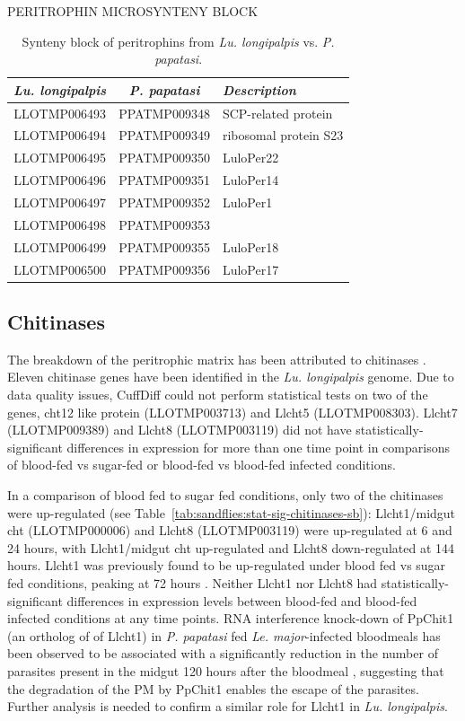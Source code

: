 \begin{table}[H]
  \centering
  \caption{PERITROPHIN MICROSYNTENY BLOCK}
  \begin{tabular}{c c l} \hline
    \emph{Lu. longipalpis} & \emph{P. papatasi} & \emph{Description} \\ \hline
    LLOTMP006493 & PPATMP009348 & SCP-related protein \\
    LLOTMP006494 & PPATMP009349 & ribosomal protein S23 \\
    LLOTMP006495 & PPATMP009350 & LuloPer22 \\
    LLOTMP006496 & PPATMP009351 & LuloPer14 \\
    LLOTMP006497 & PPATMP009352 & LuloPer1 \\
    LLOTMP006498 & PPATMP009353 &  \\
    LLOTMP006499 & PPATMP009355 & LuloPer18 \\
    LLOTMP006500 & PPATMP009356 & LuloPer17
  \end{tabular}
  \caption*{Synteny block of peritrophins from \emph{Lu. longipalpis} vs. \emph{P. papatasi}.}
  \label{tab:synteny-llot-ppat-peritrophic}
\end{table}


\subsection{Chitinases}
The breakdown of the peritrophic matrix has been attributed to chitinases \cite{Dostalova2012}. Eleven chitinase genes have been identified in the \emph{Lu. longipalpis} genome. Due to data quality issues, CuffDiff could not perform statistical tests on two of the genes, cht12 like protein (LLOTMP003713) and Llcht5 (LLOTMP008303). Llcht7 (LLOTMP009389) and Llcht8 (LLOTMP003119) did not have statistically-significant differences in expression for more than one time point in comparisons of blood-fed vs sugar-fed or blood-fed vs blood-fed infected conditions.

In a comparison of blood fed to sugar fed conditions, only two of the chitinases were up-regulated (see Table~\ref{tab:sandflies:stat-sig-chitinases-sb}): Llcht1/midgut cht (LLOTMP000006) and Llcht8 (LLOTMP003119) were up-regulated at 6 and 24 hours, with Llcht1/midgut cht up-regulated and Llcht8 down-regulated at 144 hours.  Llcht1 was previously found to be up-regulated under blood fed vs sugar fed conditions, peaking at 72 hours \cite{Ramalho-Ortigao2003}. Neither Llcht1 nor Llcht8 had statistically-significant differences in expression levels between blood-fed and blood-fed infected conditions at any time points. RNA interference knock-down of PpChit1 (an ortholog of of Llcht1) in \emph{P. papatasi} fed \emph{Le. major}-infected bloodmeals has been observed to be associated with a significantly reduction in the number of parasites present in the midgut 120 hours after the bloodmeal \cite{Coutinho-abreu2010}, suggesting that the degradation of the PM by PpChit1 enables the escape of the parasites.  Further analysis is needed to confirm a similar role for Llcht1 in \emph{Lu. longipalpis}. 

